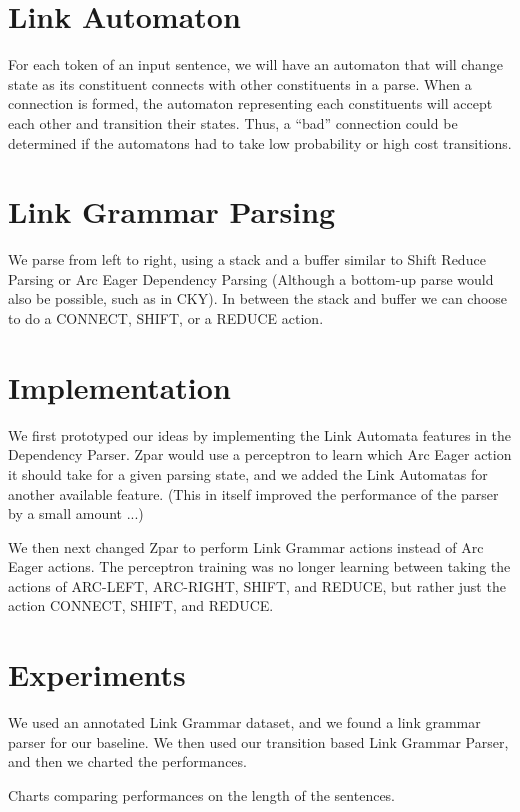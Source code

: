 \documentclass[11pt]{article}
\begin{document}
\section{Link Automaton}
For each token of an input sentence, we will have an automaton that will change state as its constituent connects with other constituents in a parse. When a connection is formed, the automaton representing each constituents will accept each other and transition their states. Thus, a ``bad'' connection could be determined if the automatons had to take low probability or high cost transitions.

\section{Link Grammar Parsing}
We parse from left to right, using a stack and a buffer similar to Shift Reduce Parsing or Arc Eager Dependency Parsing (Although a bottom-up parse would also be possible, such as in CKY). In between the stack and buffer we can choose to do a CONNECT, SHIFT, or a REDUCE action. 


\section{Implementation}
We first prototyped our ideas by implementing the Link Automata features in the Dependency Parser. Zpar would use a perceptron to learn which Arc Eager action it should take for a given parsing state, and we added the Link Automatas for another available feature. (This in itself improved the performance of the parser by a small amount ...)

We then next changed Zpar to perform Link Grammar actions instead of Arc Eager actions. The perceptron training was no longer learning between taking the actions of ARC-LEFT, ARC-RIGHT, SHIFT, and REDUCE, but rather just the action CONNECT, SHIFT, and REDUCE.







\section{Experiments}

We used an annotated Link Grammar dataset, and we found a link grammar parser for our baseline. We then used our transition based Link Grammar Parser, and then we charted the performances.

Charts comparing performances on the length of the sentences. 
\end{document}
